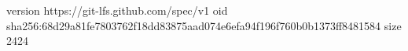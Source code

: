 version https://git-lfs.github.com/spec/v1
oid sha256:68d29a81fe7803762f18dd83875aad074e6efa94f196f760b0b1373ff8481584
size 2424
